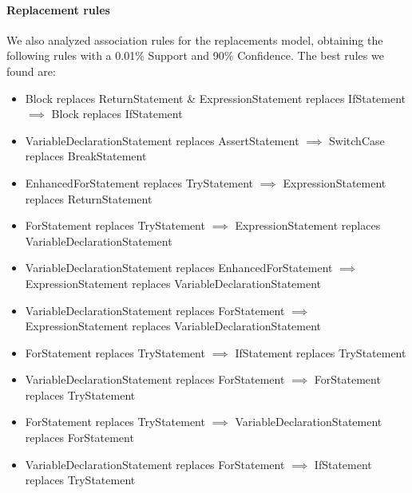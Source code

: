 \documentclass[conference]{IEEEtran}
\begin{document}
\paragraph {Replacement rules} We also analyzed association rules for the
replacements model, obtaining
the following rules with a 0.01\% Support and 90\% Confidence. %
The best rules we found are: 
\begin{itemize}
\item Block replaces ReturnStatement \& ExpressionStatement replaces IfStatement $\implies$ Block replaces IfStatement
\item VariableDeclarationStatement replaces AssertStatement $\implies$ SwitchCase replaces BreakStatement
\item EnhancedForStatement replaces TryStatement $\implies$ ExpressionStatement replaces ReturnStatement
\item ForStatement replaces TryStatement $\implies$ ExpressionStatement replaces VariableDeclarationStatement
\item VariableDeclarationStatement replaces EnhancedForStatement $\implies$ ExpressionStatement replaces VariableDeclarationStatement
\item VariableDeclarationStatement replaces ForStatement $\implies$ ExpressionStatement replaces VariableDeclarationStatement
\item ForStatement replaces TryStatement $\implies$ IfStatement replaces TryStatement
\item VariableDeclarationStatement replaces ForStatement $\implies$ ForStatement replaces TryStatement
\item ForStatement replaces TryStatement $\implies$ VariableDeclarationStatement replaces ForStatement
\item VariableDeclarationStatement replaces ForStatement $\implies$ IfStatement replaces TryStatement
\end{itemize}

\end{document}
